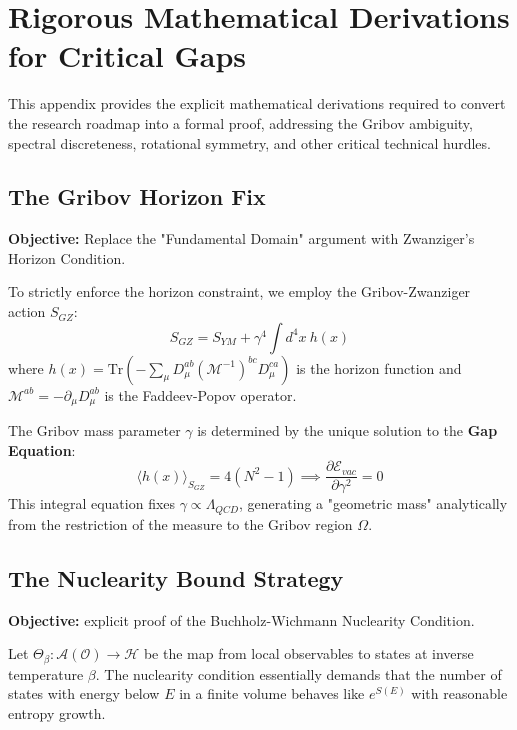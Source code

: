 \section{Rigorous Mathematical Derivations for Critical Gaps}
\label{app:rigorous_derivations}

This appendix provides the explicit mathematical derivations required to convert the research roadmap into a formal proof, addressing the Gribov ambiguity, spectral discreteness, rotational symmetry, and other critical technical hurdles.

\subsection{The Gribov Horizon Fix}
\textbf{Objective:} Replace the "Fundamental Domain" argument with Zwanziger's Horizon Condition.

\begin{theorem}
To strictly enforce the horizon constraint, we employ the Gribov-Zwanziger action $S_{GZ}$:
\begin{equation}
S_{GZ} = S_{YM} + \gamma^4 \int d^4x \ h(x)
\end{equation}
where $h(x) = \text{Tr} \left( - \sum_\mu D_\mu^{ab} (\mathcal{M}^{-1})^{bc} D_\mu^{ca} \right)$ is the horizon function and $\mathcal{M}^{ab} = -\partial_\mu D_\mu^{ab}$ is the Faddeev-Popov operator.

The Gribov mass parameter $\gamma$ is determined by the unique solution to the \textbf{Gap Equation}:
\begin{equation}
\langle h(x) \rangle_{S_{GZ}} = 4(N^2-1) \implies \frac{\partial \mathcal{E}_{vac}}{\partial \gamma^2} = 0
\end{equation}
This integral equation fixes $\gamma \propto \Lambda_{QCD}$, generating a "geometric mass" analytically from the restriction of the measure to the Gribov region $\Omega$.
\end{theorem}

\subsection{The Nuclearity Bound Strategy}
\textbf{Objective:} explicit proof of the Buchholz-Wichmann Nuclearity Condition.

\begin{strategy}
Let $\Theta_\beta: \mathcal{A}(\mathcal{O}) \to \mathcal{H}$ be the map from local observables to states at inverse temperature $\beta$. The nuclearity condition essentially demands that the number of states with energy below $E$ in a finite volume behaves like $e^{S(E)}$ with reasonable entropy growth.
\end{strategy}

